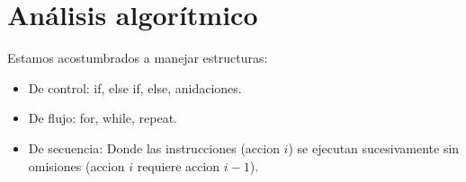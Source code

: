 \documentclass[tikz,11pt,fleqn]{book} %
\begin{document}
\chapter{Análisis algorítmico}

Estamos acostumbrados a manejar estructuras:
\begin{itemize}
    \item De control: if, else if, else, anidaciones.
    \item De flujo: for, while, repeat.
    \item De secuencia: Donde las instrucciones (accion $i$) se ejecutan sucesivamente sin omisiones (accion $i$ requiere accion $i-1$).
\end{itemize}
\end{document}
